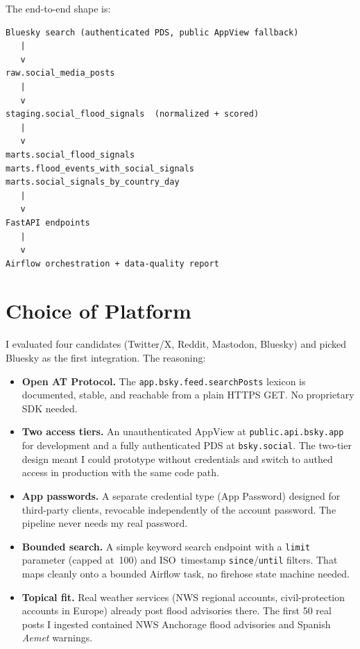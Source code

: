 \documentclass[11pt]{article}
\begin{document}
The end-to-end shape is:

\begin{lstlisting}
Bluesky search (authenticated PDS, public AppView fallback)
   |
   v
raw.social_media_posts
   |
   v
staging.social_flood_signals  (normalized + scored)
   |
   v
marts.social_flood_signals
marts.flood_events_with_social_signals
marts.social_signals_by_country_day
   |
   v
FastAPI endpoints
   |
   v
Airflow orchestration + data-quality report
\end{lstlisting}

\section{Choice of Platform}

I evaluated four candidates (Twitter/X, Reddit, Mastodon, Bluesky) and
picked Bluesky as the first integration. The reasoning:

\begin{itemize}[leftmargin=*]
  \item \textbf{Open AT Protocol.} The
        \texttt{app.bsky.feed.searchPosts} lexicon is documented, stable,
        and reachable from a plain HTTPS GET. No proprietary SDK needed.
  \item \textbf{Two access tiers.} An unauthenticated AppView at
        \texttt{public.api.bsky.app} for development and a fully
        authenticated PDS at \texttt{bsky.social}. The two-tier design
        meant I could prototype without credentials and switch to authed
        access in production with the same code path.
  \item \textbf{App passwords.} A separate credential type (App Password)
        designed for third-party clients, revocable independently of the
        account password. The pipeline never needs my real password.
  \item \textbf{Bounded search.} A simple keyword search endpoint with a
        \texttt{limit} parameter (capped at~100) and ISO~timestamp
        \texttt{since}/\texttt{until} filters. That maps cleanly onto a
        bounded Airflow task, no firehose state machine needed.
  \item \textbf{Topical fit.} Real weather services (NWS regional
        accounts, civil-protection accounts in Europe) already post
        flood advisories there. The first 50 real posts I ingested
        contained NWS Anchorage flood advisories and Spanish
        \emph{Aemet} warnings.
\end{itemize}
\end{document}
